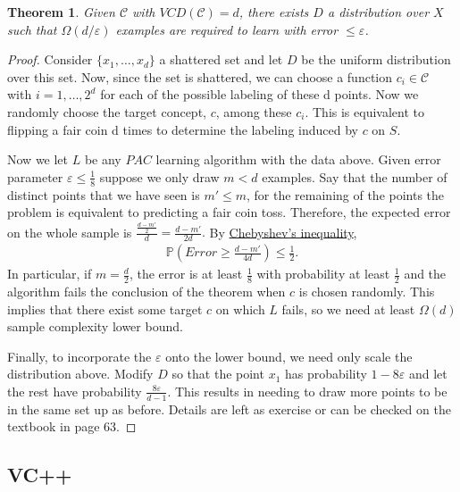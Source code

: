 \documentclass[12pt, letterpaper]{article}
\numberwithin{equation}{section} %
\newcommand{\mb}{\mathbb}
\newcommand{\mc}{\mathcal}
\newcommand{\ve}{\varepsilon}
\newtheorem{theorem}{Theorem}[section]
\theoremstyle{definition}
\theoremstyle{remark}
\begin{document}
\begin{theorem}
    Given $\mc C$ with $VCD(\mc C)=d$, there exists $D$ a distribution over $X$ such that $\Omega(d/\ve)$ examples are required to learn with error $\leq \ve$.
\end{theorem}
\begin{proof}
    Consider $\lbrace x_1,\ldots,x_d\rbrace$ a shattered set and let $D$ be the uniform distribution over this set. Now, since the set is shattered, we can choose a function $c_i\in \mc C$ with $i=1,\ldots,2^d$  for each of the possible labeling of these d points. Now we randomly choose the target concept, $c$, among these $c_i$. This is equivalent to flipping a fair coin d times to determine the labeling induced by $c$ on $S$.
    
    Now we let $L$ be any $PAC$ learning algorithm with the data above. Given error parameter $\ve \leq \frac18$ suppose we only draw $m < d$ examples. Say that the number of distinct points that we have seen is $m' \leq m$,  for the remaining of the points the problem is equivalent to predicting a fair coin toss. Therefore, the expected error on the whole sample is $\frac{\frac{d-m'}2}d = \frac{d-m'}{2d}.$ By \href{https://en.wikipedia.org/wiki/Markov's_inequality}{Chebyshev's inequality},
    \begin{align}
        \mb P\left(Error\geq \frac{d-m'}{4d}\right) \leq \frac12.
    \end{align}
    In particular, if $m=\frac d2$, the error is at least $\frac 18$ with probability at least $\frac 12$ and the algorithm fails the conclusion of the theorem when $c$ is chosen randomly. This implies that there exist some target $c$ on which $L$ fails, so we need at least $\Omega(d)$ sample complexity lower bound.
    
    Finally, to incorporate the $\ve$ onto the lower bound, we need only scale the distribution above. Modify $D$ so that  the point $x_1$ has  probability $1-8\ve$ and let the rest have probability $\frac{8\ve}{d-1}$. This results in needing to draw more points to be in the same set up as before. Details are left as exercise or can be checked on the textbook in page 63.
\end{proof}
\subsection{VC++}
\end{document}
